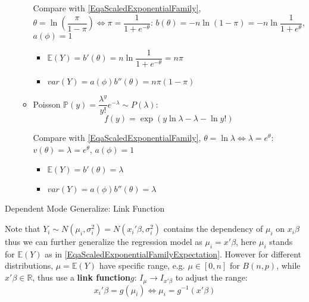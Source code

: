 \begin{itemize}[topsep=2pt,itemsep=0pt]
\begin{itemize}[topsep=2pt,itemsep=0pt]
    Compare with \autoref{EqaScaledExponentialFamily}, $ \theta =\ln(\dfrac{\pi}{1-\pi})\Leftrightarrow \pi=\dfrac{1}{1+e^{-\theta }}$: $ b(\theta )=-n\ln(1-\pi)=-n\ln\dfrac{1}{1+e^\theta } $, $ a(\phi )=1 $
    \begin{itemize}[topsep=2pt,itemsep=0pt]
        \item $ \mathbb{E}(Y)=b'(\theta )=n\ln\dfrac{1}{1+e^{-\theta }}=n\pi $
        \item $ var(Y)=a(\phi )b''(\theta )=n\pi(1-\pi) $
    \end{itemize}
    \item Poisson $ \mathbb{P} (y)=\dfrac{\lambda^y }{y!}e^{-\lambda } \sim P(\lambda ) $:
    \begin{equation}
        f(y)=\exp\left( y\ln\lambda -\lambda-\ln y!  \right) 
    \end{equation}
    
    Compare with \autoref{EqaScaledExponentialFamily}, $ \theta =\ln\lambda \Leftrightarrow \lambda =e^\theta $: $ v(\theta )=\lambda =e^\theta  $, $ a(\phi )=1 $
    \begin{itemize}[topsep=2pt,itemsep=0pt]
        \item $ \mathbb{E}(Y)=b'(\theta )=\lambda  $
        \item $ var(Y)=a(\phi )b''(\theta )=\lambda  $
    \end{itemize}

\end{itemize}
\end{itemize}

\begin{point}
    Dependent Mode Generalize: Link Function
\end{point}

    Note that $ Y_i\sim N(\mu_i,\sigma _i^2)=N(x_i'\beta ,\sigma _i^2) $ contains the dependency of $ \mu_i  $ on  $ x_i\beta  $ thus we can further generalize the regression model as $ \mu _i=x'\beta   $, here $ \mu _i $ stands for $ \mathbb{E}(Y) $ as in \autoref{EqaScaledExponentialFamilyExpectation}. However for different distributions, $ \mu=\mathbb{E}(Y) $ have specific range, e.g. $ \mu\in [0,n] $ for $ B(n,p) $, while $ x'\beta \in \mathbb{R} $, thus use a \textbf{link function}$ g $: $ I_{\mu}\to I_{x'\beta } $ to adjust the range:
    \begin{equation}
         x_i'\beta = g(\mu_i )\Leftrightarrow \mu _i=g^{-1}(x'\beta )
    \end{equation}
    
